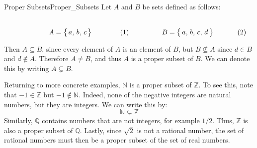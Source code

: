         \begin{lexample}{Proper Subsets}{Proper_Subsets}
            Let $A$ and $B$ be sets defined as follows:
            \par
            \begin{subequations}
                \begin{minipage}[b]{0.49\textwidth}
                    \centering
                    \begin{equation}
                        A=\big\{\,a,\,b,\,c\,\big\}
                    \end{equation}
                \end{minipage}
                \hfill
                \begin{minipage}[b]{0.49\textwidth}
                    \centering
                    \begin{equation}
                        B=\big\{\,a,\,b,\,c,\,d\,\big\}
                    \end{equation}
                \end{minipage}
            \end{subequations}
            \par\vspace{2.5ex}
            Then $A\subseteq{B}$, since every element of $A$ is an element of
            $B$, but $B\nsubseteq{A}$ since $d\in{B}$ and $d\notin{A}$.
            Therefore $A\ne{B}$, and thus $A$ is a proper subset of $B$. We can
            denote this by writing $A\subsetneq{B}$.
        \end{lexample}
        \begin{example}
            Returning to more concrete examples, $\mathbb{N}$ is a proper subset
            of $\mathbb{Z}$. To see this, note that $\minus{1}\in\mathbb{Z}$ but
            $\minus{1}\notin\mathbb{N}$. Indeed, none of the negative integers
            are natural numbers, but they are integers. We can write this by:
            \begin{equation}
                \mathbb{N}\subsetneq\mathbb{Z}
            \end{equation}
            Similarly, $\mathbb{Q}$ contains numbers that are not integers,
            for example $1/2$. Thus, $\mathbb{Z}$ is also a proper subset of
            $\mathbb{Q}$. Lastly, since $\sqrt{2}$ is not a rational number, the
            set of rational numbers must then be a proper subset of the set of
            real numbers.
        \end{example}
